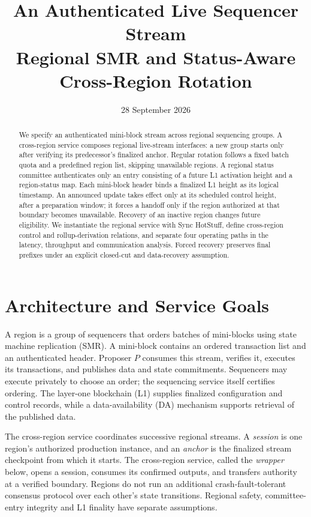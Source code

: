 \documentclass[11pt,a4paper,onecolumn]{article}
\title{An Authenticated Live Sequencer Stream\\
\large Regional SMR and Status-Aware Cross-Region Rotation}
\author{}\date{28 September 2026}
\newcounter{protocol}
\begin{document}
\maketitle
\begin{abstract}
We specify an authenticated mini-block stream across regional sequencing
groups. A cross-region service composes regional live-stream interfaces:
a new group starts only after verifying its predecessor's finalized anchor.
Regular rotation follows a fixed batch quota and a predefined region list,
skipping unavailable regions. A regional status committee authenticates only
an entry consisting of a future L1 activation height and a region-status
map. Each mini-block header binds a finalized L1 height as its logical
timestamp. An announced update takes effect only at its scheduled control
height, after a preparation window; it forces a handoff only if the region
authorized at that boundary becomes unavailable. Recovery of an inactive
region changes future eligibility. We instantiate
the regional service with Sync HotStuff, define cross-region control and
rollup-derivation relations, and separate four operating paths in the latency,
throughput and communication analysis. Forced recovery preserves final
prefixes under an explicit closed-cut and data-recovery assumption.
\end{abstract}

\section{Architecture and Service Goals}\label{sec:architecture}
A region is a group of sequencers that orders batches of mini-blocks using
state machine replication (SMR). A mini-block contains an ordered transaction
list and an authenticated header. Proposer $P$ consumes this stream, verifies
it, executes its transactions, and publishes data and state commitments.
Sequencers may execute privately to choose an order; the sequencing service
itself certifies ordering. The layer-one blockchain (L1) supplies finalized
configuration and control records, while a data-availability (DA) mechanism
supports retrieval of the published data.

The cross-region service coordinates successive regional streams. A
\emph{session} is one region's authorized production instance, and an
\emph{anchor} is the finalized stream checkpoint from which it starts.
The cross-region service, called the \emph{wrapper} below, opens a session,
consumes its confirmed outputs, and transfers authority at a verified
boundary. Regions
do not run an additional crash-fault-tolerant consensus protocol over each
other's state transitions. Regional safety, committee-entry integrity and
L1 finality have separate assumptions.
\end{document}
